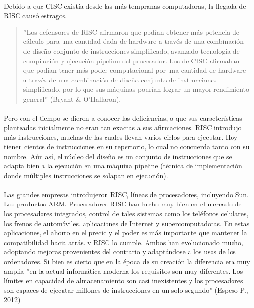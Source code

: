 \documentclass[10pt,a4paper]{article}
\begin{document}
\paragraph{}
Debido a que CISC existía desde las más tempranas computadoras, la llegada de RISC causó estragos.
\begin{quote}
''Los defensores de RISC afirmaron que podían obtener más potencia de cálculo para una cantidad dada de hardware a través de una combinación de diseño conjunto de instrucciones simplificado, avanzado tecnología de compilación y ejecución pipeline del procesador. Los de CISC afirmaban que podían tener más poder computacional por una cantidad de hardware a través de una combinación de diseño conjunto de instrucciones simplificado, por lo que sus máquinas podrían lograr un mayor rendimiento general'' (Bryant \& O'Hallaron).
\end{quote}

\paragraph{}
Pero con el tiempo se dieron a conocer las deficiencias, o que sus características planteadas inicialmente no eran tan exactas a sus afirmaciones. RISC introdujo más instrucciones, muchas de las cuales llevan varios ciclos para ejecutar. Hoy tienen cientos de instrucciones en su repertorio, lo cual no concuerda tanto con su nombre. Aún así, el núcleo del diseño es un conjunto de instrucciones que se adapta bien a la ejecución en una máquina pipeline (técnica de implementación donde múltiples instrucciones se solapan en ejecución).
	 	 	 	
\paragraph{}
Las grandes empresas introdujeron RISC, líneas de procesadores, incluyendo Sun. Los productos ARM. Procesadores RISC han hecho muy bien en el mercado de los procesadores integrados, control de tales sistemas como los teléfonos celulares, los frenos de automóviles, aplicaciones de Internet y supercomputadoras. En estas aplicaciones, el ahorro en el precio y el poder es más importante que mantener la compatibilidad hacia atrás, y RISC lo cumple. Ambos han evolucionado mucho, adoptando mejoras provenientes del contrario y adaptándose a los usos de los ordenadores. Si bien es cierto que en la época de su creación la diferencia era muy amplia ''en la actual informática moderna los requisitos son muy diferentes. Los límites en capacidad de almacenamiento son casi inexistentes y los procesadores son capaces de ejecutar millones de instrucciones en un solo segundo'' (Espeso P., 2012).
\end{document}
